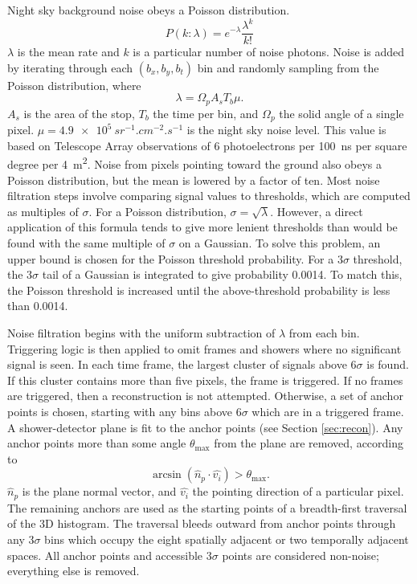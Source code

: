 Night sky background noise obeys a Poisson distribution.
\begin{equation} \label{eq:poisson}
    P(k: \lambda) = e^{-\lambda}\frac{\lambda^k}{k!}
\end{equation}
$\lambda$ is the mean rate and $k$ is a particular number of noise photons. Noise is added by iterating through each $(b_x, b_y, b_t)$ bin and randomly sampling from the Poisson distribution, where
\begin{equation}
    \lambda = \Omega_p  A_s  T_b  \mu.
\end{equation}
$A_s$ is the area of the stop, $T_b$ the time per bin, and $\Omega_p$ the solid angle of a single pixel. $\mu = \SI{4.9e5}{sr^{-1}.cm^{-2}.s^{-1}}$ is the night sky noise level. This value is based on Telescope Array observations of 6 photoelectrons per \SI{100}{ns} per square degree per \SI{4}{m^2}. Noise from pixels pointing toward the ground also obeys a Poisson distribution, but the mean is lowered by a factor of ten. Most noise filtration steps involve comparing signal values to thresholds, which are computed as multiples of $\sigma$. For a Poisson distribution, $\sigma=\sqrt{\lambda}$. However, a direct application of this formula tends to give more lenient thresholds than would be found with the same multiple of $\sigma$ on a Gaussian. To solve this problem, an upper bound is chosen for the Poisson threshold probability. For a $3\sigma$ threshold, the $3\sigma$ tail of a Gaussian is integrated to give probability \num{0.0014}. To match this, the Poisson threshold is increased until the above-threshold probability is less than \num{0.0014}.

Noise filtration begins with the uniform subtraction of $\lambda$ from each bin. Triggering logic is then applied to omit frames and showers where no significant signal is seen. In each time frame, the largest cluster of signals above $6\sigma$ is found. If this cluster contains more than five pixels, the frame is triggered. If no frames are triggered, then a reconstruction is not attempted. Otherwise, a set of anchor points is chosen, starting with any bins above $6\sigma$ which are in a triggered frame. A shower-detector plane is fit to the anchor points (see Section \ref{sec:recon}). Any anchor points more than some angle $\theta_\text{max}$ from the plane are removed, according to
\begin{equation}
    \arcsin(\hat{n}_p \cdot \hat{v_i}) > \theta_\text{max}.
\end{equation}
$\hat{n}_p$ is the plane normal vector, and $\hat{v_i}$ the pointing direction of a particular pixel. The remaining anchors are used as the starting points of a breadth-first traversal of the 3D histogram. The traversal bleeds outward from anchor points through any $3\sigma$ bins which occupy the eight spatially adjacent or two temporally adjacent spaces. All anchor points and accessible $3\sigma$ points are considered non-noise; everything else is removed.

